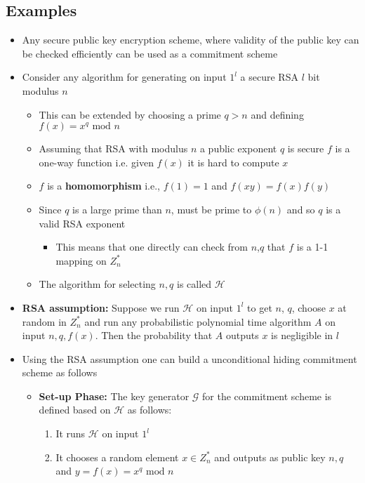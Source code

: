 \subsection{Examples}
\begin{itemize}
  \item Any secure public key encryption scheme, where validity of the public key can be checked efficiently can be used as a commitment scheme
  \item Consider any algorithm for generating on input $1^l$ a secure RSA $l$ bit modulus $n$
  \begin{itemize}
  	\item This can be extended by choosing a prime $q > n$ and defining $f(x) = x^q \text{ mod } n$
  	\item Assuming that RSA with modulus $n$ a public exponent $q$ is secure $f$ is a one-way function i.e. given $f(x)$ it is hard to compute $x$
  	\item $f$ is a \textbf{homomorphism} i.e., $f(1) = 1$ and $f(xy) = f(x)f(y)$
  	\item Since $q$ is a large prime than $n$, must be prime to $\phi(n)$ and so $q$ is a valid RSA exponent
    \begin{itemize}
  		\item This means that one directly can check from $n$,$q$ that $f$ is a 1-1 mapping on $Z_n^*$
    \end{itemize}
  	\item The algorithm for selecting $n,q$ is called $\mathcal H$
  \end{itemize}
  \item \textbf{RSA assumption:} Suppose we run $\mathcal H$ on input $1^l$ to get $n$, $q$, choose $x$ at random in $Z_n^*$ and run any probabilistic polynomial time algorithm $A$ on input $n,q,f(x)$. Then the probability that $A$ outputs $x$ is negligible in $l$
  \item Using the RSA assumption one can build a unconditional hiding commitment scheme as follows
  \begin{itemize}
  	\item \textbf{Set-up Phase:} The key generator $\mathcal G$ for the commitment scheme is defined based on $\mathcal H$ as follows:
    \begin{enumerate}
		  \item It runs $\mathcal H$ on input $1^l$
      \item It chooses a random element $x \in Z^*_n$ and outputs as public key $n,q$ and $y = f(x)= x^q \text{ mod } n$

\end{enumerate}
\end{itemize}
\end{itemize}

